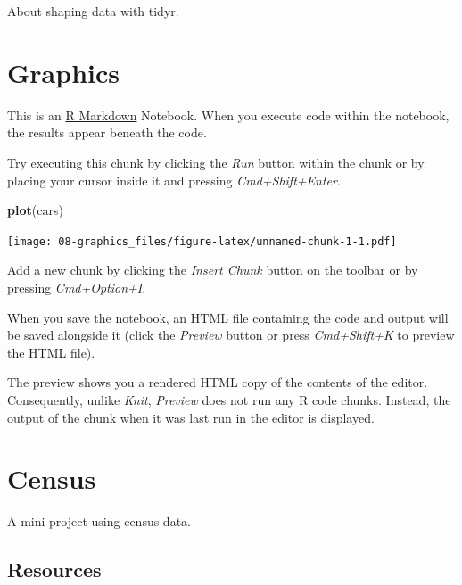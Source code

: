 \documentclass[]{book}
\newenvironment{Shaded}{\begin{snugshade}}{\end{snugshade}}
\newcommand{\KeywordTok}[1]{\textcolor[rgb]{0.13,0.29,0.53}{\textbf{#1}}}
\newcommand{\NormalTok}[1]{#1}
\begin{document}
About shaping data with tidyr.

\chapter{Graphics}\label{graphics}

This is an \href{http://rmarkdown.rstudio.com}{R Markdown} Notebook.
When you execute code within the notebook, the results appear beneath
the code.

Try executing this chunk by clicking the \emph{Run} button within the
chunk or by placing your cursor inside it and pressing
\emph{Cmd+Shift+Enter}.

\begin{Shaded}
\begin{Highlighting}[]
\KeywordTok{plot}\NormalTok{(cars)}
\end{Highlighting}
\end{Shaded}

\texttt{[image: 08-graphics\_files/figure-latex/unnamed-chunk-1-1.pdf]}

Add a new chunk by clicking the \emph{Insert Chunk} button on the
toolbar or by pressing \emph{Cmd+Option+I}.

When you save the notebook, an HTML file containing the code and output
will be saved alongside it (click the \emph{Preview} button or press
\emph{Cmd+Shift+K} to preview the HTML file).

The preview shows you a rendered HTML copy of the contents of the
editor. Consequently, unlike \emph{Knit}, \emph{Preview} does not run
any R code chunks. Instead, the output of the chunk when it was last run
in the editor is displayed.

\chapter{Census}\label{census}

A mini project using census data.

\section{Resources}\label{resources}
\end{document}

